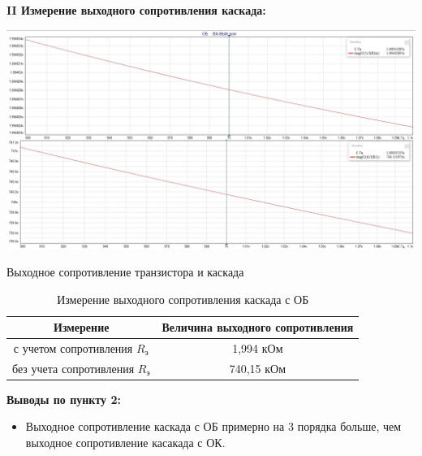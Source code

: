 \documentclass[a4paper,14pt]{extarticle}
\begin{document}
    \newpage
    \textbf{II Измерение выходного сопротивления каскада:}
    \begin{center}
        \includegraphics[scale=0.25]{2.jpg}
    \end{center}
    \begin{center}
        Выходное сопротивление транзистора и каскада
    \end{center}
    \begin{table}[ht]
        \begin{center}
            \caption{Измерение выходного сопротивления каскада с ОБ}
            \begin{tabular}{ |c|c| }
                \hline
                Измерение & Величина выходного сопротивления
                \tabularnewline
                \hline
                с учетом сопротивления $R_{\text{э}}$ & 1,994 кОм
                \tabularnewline
                \hline
                без учета сопротивления $R_{\text{э}}$ & 740,15 кОм
                \tabularnewline
                \hline
            \end{tabular}
        \end{center}
    \end{table}

    \textbf{Выводы по пункту 2:}
    \vspace{-6ex}
    \begin{singlespace}
        \begin{itemize}
            \item Выходное сопротивление каскада с ОБ примерно на 3 порядка больше, 
            чем выходное сопротивление касакада с ОК.
            
        \end{itemize}
    \end{singlespace}
\end{document}
